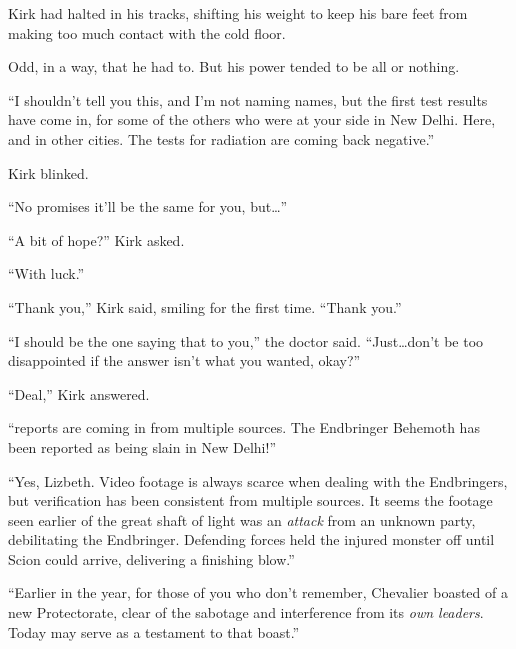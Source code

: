 Kirk had halted in his tracks, shifting his weight to keep his bare feet from making too much contact with the cold floor.



Odd, in a way, that he had to.  But his power tended to be all or nothing.



``I shouldn't tell you this, and I'm not naming names, but the first test results have come in, for some of the others who were at your side in New Delhi.  Here, and in other cities.  The tests for radiation are coming back negative.''



Kirk blinked.



``No promises it'll be the same for you, but\ldots''



``A bit of hope?'' Kirk asked.



``With luck.''



``Thank you,'' Kirk said, smiling for the first time.  ``Thank you.''



``I should be the one saying that to you,'' the doctor said.  ``Just\ldots don't be too disappointed if the answer isn't what you wanted, okay?''



``Deal,'' Kirk answered.



\sectionbreak



``\ldotsfurther reports are coming in from multiple sources.  The Endbringer Behemoth has been reported as being slain in New Delhi!''



``Yes, Lizbeth.  Video footage is always scarce when dealing with the Endbringers, but verification has been consistent from multiple sources.  It seems the footage seen earlier of the great shaft of light was an \emph{attack} from an unknown party, debilitating the Endbringer.  Defending forces held the injured monster off until Scion could arrive, delivering a finishing blow.''



``Earlier in the year, for those of you who don't remember, Chevalier boasted of a new Protectorate, clear of the sabotage and interference from its \emph{own leaders}.  Today may serve as a testament to that boast.''




